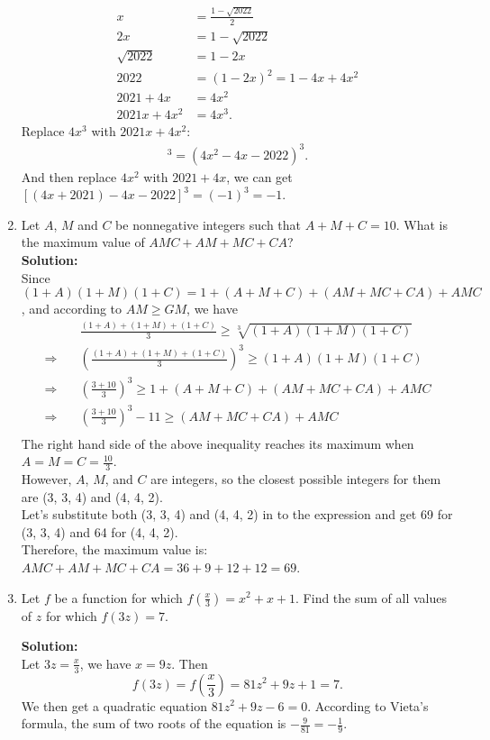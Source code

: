 \documentclass[11pt, oneside]{article}   	%
\begin{document}
\begin{enumerate}
\begin{align*}
x & =\frac{1-\sqrt{2022}}{2} \\
2x & = 1 - \sqrt{2022}\\
\sqrt{2022} & = 1 - 2x \\
2022 & = (1 - 2x)^2 = 1 - 4x + 4x^2\\
2021 + 4x & = 4x^2 \\
2021x + 4x^2 & = 4x^3. 
\end{align*}
Replace $4x^3$ with $2021x + 4x^2$: 
\begin{align*}
[(4x^2 + 2021x) - 2025x - 2022]^3 = (4x^2 - 4x -2022)^3. 
\end{align*}
And then replace $4x^2$ with $2021 + 4x$, we can get $[(4x + 2021) -4x -2022]^3 = (-1)^3 = -1$. 



\item Let $A$, $M$ and $C$ be nonnegative integers such that $A+M+C=10$. What is the maximum value of $AMC+AM+MC+CA$? \\

\textbf{Solution:} \\ 
Since $(1+A)(1+M)(1+C)=1 + (A+M+C)+(AM+MC+CA)+AMC$, and according to $AM \ge GM$, we have 
\begin{align*} 
& \frac{(1+A)+(1+M)+(1+C)}{3} \ge \sqrt[3]{(1+A)(1+M)(1+C)} \\ 
\Rightarrow \quad & \left(\frac{(1+A)+(1+M)+(1+C)}{3}\right)^3 \ge (1+A)(1+M)(1+C) \\ 
\Rightarrow \quad & \left(\frac{3+10}{3}\right)^3 \ge 1 + (A+M+C)+(AM+MC+CA)+AMC \\
\Rightarrow \quad & \left(\frac{3+10}{3}\right)^3 -11 \ge (AM+MC+CA)+AMC \\ 
\end{align*} 
The right hand side of the above inequality reaches its maximum when $A=M=C=\frac{10}{3}$. \\
However, $A$, $M$, and $C$ are integers, so the closest possible integers for them are (3, 3, 4) and (4, 4, 2).  \\
Let's substitute both (3, 3, 4) and (4, 4, 2) in to the expression and get 69 for (3, 3, 4) and 64 for (4, 4, 2). \\
Therefore, the maximum value is:  $AMC+AM+MC+CA=36+9+12+12 = 69$. 


\item Let $f$ be a function for which $f(\frac{x}{3}) = x^2 + x + 1$. Find the sum of all values of $z$ for which $f(3z)=7$. 

\textbf{Solution:} \\ 
Let $3z=\frac{x}{3}$, we have $x=9z$. Then
\[
f(3z)=f(\frac{x}{3})=81z^2 + 9z + 1 =7. 
\]
We then get a quadratic equation $81z^2 + 9z - 6 = 0$. 
According to Vieta's formula, the sum of two roots of the equation is $-\frac{9}{81} = -\frac{1}{9}$. 


\end{enumerate} 
\end{document}
